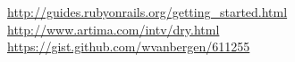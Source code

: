 \begin{thebibliography}{99999}
\singlespace\normalsize

 \url{http://guides.rubyonrails.org/getting_started.html}
 \url{http://www.artima.com/intv/dry.html}
 \url{https://gist.github.com/wvanbergen/611255}

\end{thebibliography}